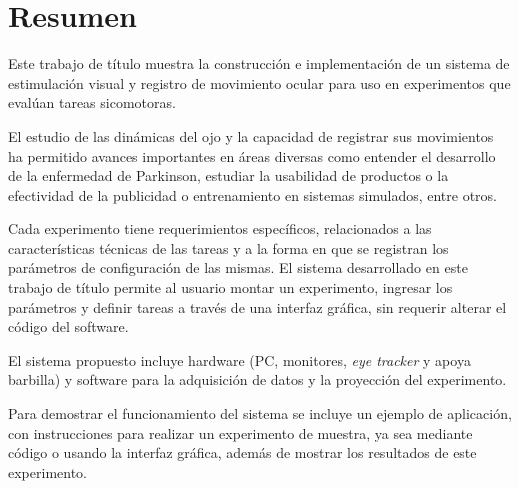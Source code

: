 \documentclass[\main/main.tex]{subfiles}
\begin{document}
\chapter{Resumen}
	Este trabajo de título muestra la construcción e implementación de un sistema de estimulación visual y registro de movimiento ocular para uso en experimentos que evalúan tareas sicomotoras.

	El estudio de las dinámicas del ojo y la capacidad de registrar sus movimientos ha permitido avances importantes en áreas diversas como entender el desarrollo de la enfermedad de Parkinson, estudiar la usabilidad de productos o la efectividad de la publicidad o entrenamiento en sistemas simulados, entre otros. 

	Cada experimento tiene requerimientos específicos, relacionados a las características técnicas de las tareas y a la forma en que se registran los parámetros de configuración de las mismas. El sistema desarrollado en este trabajo de título permite al usuario montar un experimento, ingresar los parámetros y definir tareas a través de una interfaz gráfica, sin requerir alterar el código del software. 

	El sistema propuesto incluye hardware (PC, monitores, \textit{eye tracker} y apoya barbilla) y software para la adquisición de datos y la proyección del experimento.

	Para demostrar el funcionamiento del sistema se incluye un ejemplo de aplicación, con instrucciones para realizar un experimento de muestra, ya sea mediante código o usando la interfaz gráfica, además de mostrar los resultados de este experimento.

	
	
\end{document}
